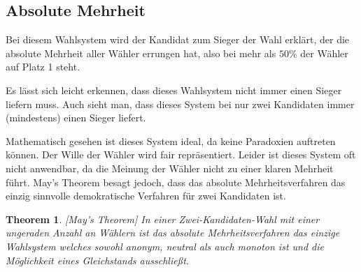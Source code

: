 \documentclass[BCOR5mm,DIV12,a4paper,10pt]{scrartcl}
\newtheorem{theorem}{Theorem} %
\begin{document}
\subsection{Absolute Mehrheit}
Bei diesem Wahlsystem wird der Kandidat zum Sieger der Wahl erklärt, der die absolute Mehrheit aller Wähler errungen hat, also bei mehr als $50\%$ der Wähler auf Platz 1 steht.

Es lässt sich leicht erkennen, dass dieses Wahlsystem nicht immer einen Sieger liefern muss. Auch sieht man, dass dieses System bei nur zwei Kandidaten immer (mindestens) einen Sieger liefert.

Mathematisch gesehen ist dieses System ideal, da keine Paradoxien auftreten können. Der Wille der Wähler wird fair repräsentiert. Leider ist dieses System oft nicht anwendbar, da die Meinung der Wähler nicht zu einer klaren Mehrheit führt. May's Theorem \cite{hodge2005mathematics} besagt jedoch, dass das absolute Mehrheitsverfahren das einzig sinnvolle demokratische Verfahren für zwei Kandidaten ist.

\begin{theorem}\emph{[May's Theorem]}
In einer Zwei-Kandidaten-Wahl mit einer ungeraden Anzahl an Wählern ist das absolute Mehrheitsverfahren das einzige Wahlsystem welches sowohl anonym, neutral als auch monoton ist und die Möglichkeit eines Gleichstands ausschließt.
\end{theorem}
\end{document}
